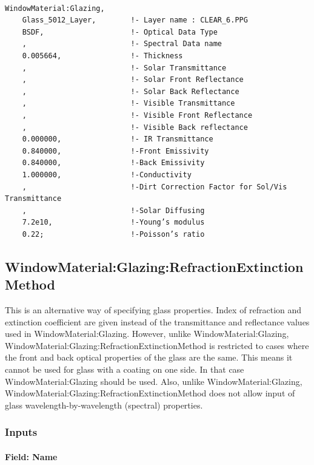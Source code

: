 \begin{lstlisting}

WindowMaterial:Glazing,
    Glass_5012_Layer,        !- Layer name : CLEAR_6.PPG
    BSDF,                    !- Optical Data Type
    ,                        !- Spectral Data name
    0.005664,                !- Thickness
    ,                        !- Solar Transmittance
    ,                        !- Solar Front Reflectance
    ,                        !- Solar Back Reflectance
    ,                        !- Visible Transmittance
    ,                        !- Visible Front Reflectance
    ,                        !- Visible Back reflectance
    0.000000,                !- IR Transmittance
    0.840000,                !-Front Emissivity
    0.840000,                !-Back Emissivity
    1.000000,                !-Conductivity
    ,                        !-Dirt Correction Factor for Sol/Vis Transmittance
    ,                        !-Solar Diffusing
    7.2e10,                  !-Young’s modulus
    0.22;                    !-Poisson’s ratio
\end{lstlisting}

\subsection{WindowMaterial:Glazing:RefractionExtinctionMethod}\label{windowmaterialglazingrefractionextinctionmethod}

This is an alternative way of specifying glass properties. Index of refraction and extinction coefficient are given instead of the transmittance and reflectance values used in WindowMaterial:Glazing. However, unlike WindowMaterial:Glazing, WindowMaterial:Glazing:RefractionExtinctionMethod is restricted to cases where the front and back optical properties of the glass are the same. This means it cannot be used for glass with a coating on one side. In that case WindowMaterial:Glazing should be used. Also, unlike WindowMaterial:Glazing, WindowMaterial:Glazing:RefractionExtinctionMethod does not allow input of glass wavelength-by-wavelength (spectral) properties.

\subsubsection{Inputs}\label{inputs-14-015}

\paragraph{Field: Name}\label{field-name-8-020}

